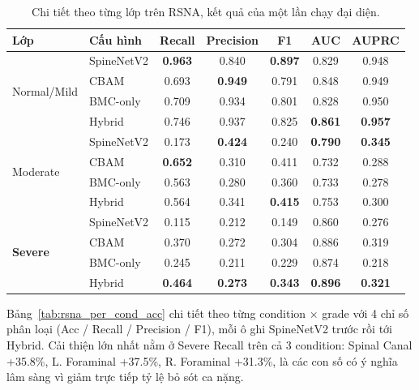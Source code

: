 \begin{table}[htbp]
\centering
\caption{Chi tiết theo từng lớp trên RSNA, kết quả của một lần chạy đại diện.}
\label{tab:rsna_perclass}
\renewcommand{\arraystretch}{1.15}
\setlength{\tabcolsep}{5pt}
\small
\begin{tabular}{llccccc}
\toprule
\textbf{Lớp} & \textbf{Cấu hình} & \textbf{Recall} & \textbf{Precision} & \textbf{F1} & \textbf{AUC} & \textbf{AUPRC} \\
\midrule
\multirow{4}{*}{Normal/Mild}
 & SpineNetV2 & \textbf{0.963} & 0.840 & \textbf{0.897} & 0.829 & 0.948 \\
 & CBAM       & 0.693 & \textbf{0.949} & 0.791 & 0.848 & 0.949 \\
 & BMC-only   & 0.709 & 0.934 & 0.801 & 0.828 & 0.950 \\
 & Hybrid     & 0.746 & 0.937 & 0.825 & \textbf{0.861} & \textbf{0.957} \\
\midrule
\multirow{4}{*}{Moderate}
 & SpineNetV2 & 0.173 & \textbf{0.424} & 0.240 & \textbf{0.790} & \textbf{0.345} \\
 & CBAM       & \textbf{0.652} & 0.310 & 0.411 & 0.732 & 0.288 \\
 & BMC-only   & 0.563 & 0.280 & 0.360 & 0.733 & 0.278 \\
 & Hybrid     & 0.564 & 0.341 & \textbf{0.415} & 0.753 & 0.300 \\
\midrule
\multirow{4}{*}{\textbf{Severe}}
 & SpineNetV2 & 0.115 & 0.212 & 0.149 & 0.860 & 0.276 \\
 & CBAM       & 0.370 & 0.272 & 0.304 & 0.886 & 0.319 \\
 & BMC-only   & 0.245 & 0.211 & 0.229 & 0.874 & 0.218 \\
 & Hybrid     & \textbf{0.464} & \textbf{0.273} & \textbf{0.343} & \textbf{0.896} & \textbf{0.321} \\
\bottomrule
\end{tabular}
\end{table}

Bảng~\ref{tab:rsna_per_cond_acc} chi tiết theo từng condition × grade với 4 chỉ số phân loại (Acc / Recall / Precision / F1), mỗi ô ghi SpineNetV2 trước rồi tới Hybrid. Cải thiện lớn nhất nằm ở Severe Recall trên cả 3 condition: Spinal Canal +35.8\%, L. Foraminal +37.5\%, R. Foraminal +31.3\%, là các con số có ý nghĩa lâm sàng vì giảm trực tiếp tỷ lệ bỏ sót ca nặng.

